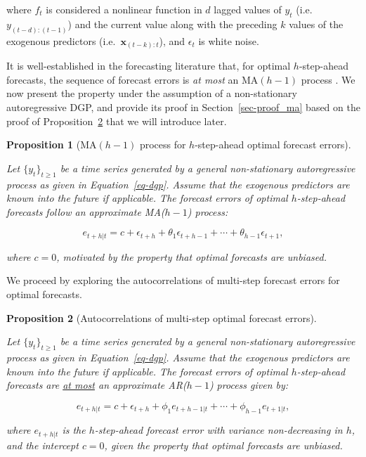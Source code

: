 \documentclass[
  11pt,
  a4paper,
]{article}
\theoremstyle{plain}
\newtheorem{proposition}{Proposition}[section]
\theoremstyle{plain}
\theoremstyle{remark}
\begin{document}
where \(f_{t}\) is considered a nonlinear function in \(d\) lagged
values of \(y_t\) (i.e.~\(y_{(t-d):(t-1)}\)) and the current value along
with the preceding \(k\) values of the exogenous predictors
(i.e.~\(\bm{x}_{(t-k):t}\)), and \(\epsilon_t\) is white noise.

It is well-established in the forecasting literature that, for optimal
\(h\)-step-ahead forecasts, the sequence of forecast errors is \emph{at
most} an MA\((h-1)\) process \autocite{harvey1997,diebold2017}. We now
present the property under the assumption of a non-stationary
autoregressive DGP, and provide its proof in Section~\ref{sec-proof_ma}
based on the proof of Proposition~\ref{prp-ar} that we will introduce
later.

\begin{proposition}[MA\((h-1)\) process for \(h\)-step-ahead optimal
forecast errors]\protect\hypertarget{prp-ma}{}\label{prp-ma}

Let \(\{y_t\}_{t \geq 1}\) be a time series generated by a general
non-stationary autoregressive process as given in Equation~\ref{eq-dgp}.
Assume that the exogenous predictors are known into the future if
applicable. The forecast errors of optimal \(h\)-step-ahead forecasts
follow an approximate MA(\(h-1\)) process:

\[
e_{t+h|t} = c + \epsilon_{t+h} + \theta_1\epsilon_{t+h-1} + \cdots + \theta_{h-1}\epsilon_{t+1},
\]

where \(c=0\), motivated by the property that optimal forecasts are
unbiased.

\end{proposition}

We proceed by exploring the autocorrelations of multi-step forecast
errors for optimal forecasts.

\begin{proposition}[Autocorrelations of multi-step optimal forecast
errors]\protect\hypertarget{prp-ar}{}\label{prp-ar}

Let \(\{y_t\}_{t \geq 1}\) be a time series generated by a general
non-stationary autoregressive process as given in Equation~\ref{eq-dgp}.
Assume that the exogenous predictors are known into the future if
applicable. The forecast errors of optimal \(h\)-step-ahead forecasts
are \ul{at most} an approximate AR(\(h-1\)) process given by:

\[
e_{t+h|t} = c + \epsilon_{t+h} + \phi_1e_{t+h-1|t} + \cdots + \phi_{h-1}e_{t+1|t},
\]

where \(e_{t+h|t}\) is the \(h\)-step-ahead forecast error with variance
non-decreasing in \(h\), and the intercept \(c=0\), given the property
that optimal forecasts are unbiased.

\end{proposition}
\end{document}
